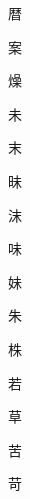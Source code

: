 \begin{spacing}{2.5}
{\Huge \begin{CJK}{UTF8}{min} 暦\end{CJK}}\hspace{0.1cm}
{\Huge \begin{CJK}{UTF8}{min} 案\end{CJK}}\hspace{0.1cm}
{\Huge \begin{CJK}{UTF8}{min} 燥\end{CJK}}\hspace{0.1cm}
{\Huge \begin{CJK}{UTF8}{min} 未\end{CJK}}\hspace{0.1cm}
{\Huge \begin{CJK}{UTF8}{min} 末\end{CJK}}\hspace{0.1cm}
{\Huge \begin{CJK}{UTF8}{min} 昧\end{CJK}}\hspace{0.1cm}
{\Huge \begin{CJK}{UTF8}{min} 沫\end{CJK}}\hspace{0.1cm}
{\Huge \begin{CJK}{UTF8}{min} 味\end{CJK}}\hspace{0.1cm}
{\Huge \begin{CJK}{UTF8}{min} 妹\end{CJK}}\hspace{0.1cm}
{\Huge \begin{CJK}{UTF8}{min} 朱\end{CJK}}\hspace{0.1cm}
{\Huge \begin{CJK}{UTF8}{min} 株\end{CJK}}\hspace{0.1cm}
{\Huge \begin{CJK}{UTF8}{min} 若\end{CJK}}\hspace{0.1cm}
{\Huge \begin{CJK}{UTF8}{min} 草\end{CJK}}\hspace{0.1cm}
{\Huge \begin{CJK}{UTF8}{min} 苦\end{CJK}}\hspace{0.1cm}
{\Huge \begin{CJK}{UTF8}{min} 苛\end{CJK}}\hspace{0.1cm}

\end{spacing}
